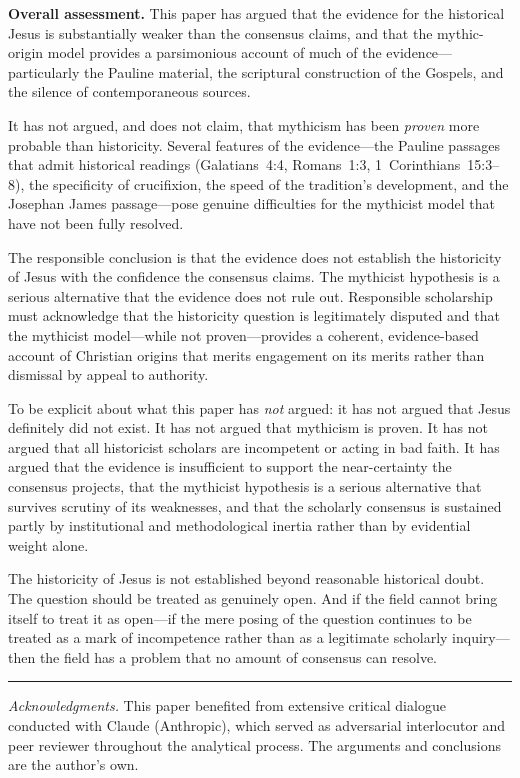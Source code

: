 \documentclass[12pt,oneside]{article}
\begin{document}
\textbf{Overall assessment.}  This paper has argued that the evidence
for the historical Jesus is substantially weaker than the consensus
claims, and that the mythic-origin model provides a parsimonious account
of much of the evidence---particularly the Pauline material, the
scriptural construction of the Gospels, and the silence of
contemporaneous sources.

It has not argued, and does not claim, that mythicism has been
\textit{proven} more probable than historicity.  Several features of the
evidence---the Pauline passages that admit historical readings
(Galatians~4:4, Romans~1:3, 1~Corinthians~15:3--8), the specificity of
crucifixion, the speed of the tradition's development, and the Josephan
James passage---pose genuine difficulties for the mythicist model that
have not been fully resolved.

The responsible conclusion is that the evidence does not establish the
historicity of Jesus with the confidence the consensus claims.  The
mythicist hypothesis is a serious alternative that the evidence does not
rule out.  Responsible scholarship must acknowledge that the historicity
question is legitimately disputed and that the mythicist model---while
not proven---provides a coherent, evidence-based account of Christian
origins that merits engagement on its merits rather than dismissal by
appeal to authority.

To be explicit about what this paper has \textit{not} argued: it has
not argued that Jesus definitely did not exist.  It has not argued that
mythicism is proven.  It has not argued that all historicist scholars
are incompetent or acting in bad faith.  It has argued that the evidence
is insufficient to support the near-certainty the consensus projects,
that the mythicist hypothesis is a serious alternative that survives
scrutiny of its weaknesses, and that the scholarly consensus is
sustained partly by institutional and methodological inertia rather than
by evidential weight alone.

The historicity of Jesus is not established beyond reasonable historical
doubt.  The question should be treated as genuinely open.  And if the
field cannot bring itself to treat it as open---if the mere posing of
the question continues to be treated as a mark of incompetence rather
than as a legitimate scholarly inquiry---then the field has a problem
that no amount of consensus can resolve.

\vspace{2em}
\begin{center}
\rule{0.5\textwidth}{0.4pt}
\end{center}
\vspace{1em}

\noindent\textit{Acknowledgments.}  This paper benefited from extensive
critical dialogue conducted with Claude (Anthropic), which served as
adversarial interlocutor and peer reviewer throughout the analytical
process.  The arguments and conclusions are the author's own.


\end{document}
